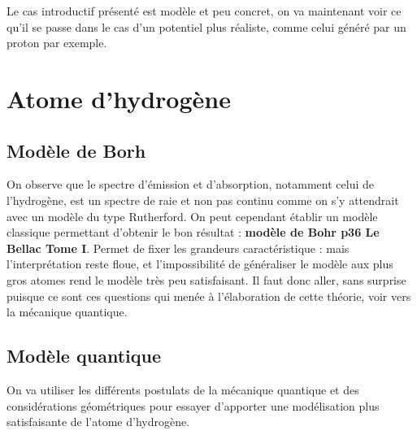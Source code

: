 \documentclass[12pt,prb,aps,epsf]{article}
\begin{document}
Le cas introductif présenté est modèle et peu concret, on va maintenant voir ce qu'il se passe dans le cas d'un potentiel plus réaliste, comme celui généré par un proton par exemple.

\section{Atome d'hydrogène}
\subsection{Modèle de Borh}
On observe que le spectre d'émission et d'absorption, notamment celui de l'hydrogène, est un spectre de raie et non pas continu comme on s'y attendrait avec un modèle du type Rutherford. On peut cependant établir un modèle classique permettant d'obtenir le bon résultat : \textbf{modèle de Bohr p36 Le Bellac Tome I}. Permet de fixer les grandeurs caractéristique : mais l'interprétation reste floue, et l'impossibilité de généraliser le modèle aux plus gros atomes rend le modèle très peu satisfaisant. Il faut donc aller, sans surprise puisque ce sont ces questions qui menée à l'élaboration de cette théorie, voir vers la mécanique quantique.

\subsection{Modèle quantique}	
On va utiliser les différents postulats de la mécanique quantique et des considérations géométriques pour essayer d'apporter une modélisation plus satisfaisante de l'atome d'hydrogène.
	
\end{document}

